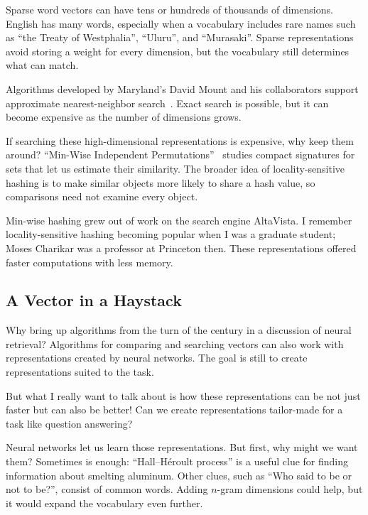 Sparse word vectors can have tens or hundreds of thousands of dimensions.  English has many words, especially when a vocabulary includes rare names such as ``the Treaty of Westphalia'', ``Uluru'', and ``Murasaki''.  Sparse representations avoid storing a weight for every dimension, but the vocabulary still determines what can match.

Algorithms developed by Maryland's David Mount and his collaborators support approximate nearest-neighbor search~\citep{arya-98}.  Exact search is possible, but it can become expensive as the number of dimensions grows.

If searching these high-dimensional representations is expensive, why keep them around?  ``Min-Wise Independent Permutations''~\citep{broder-98} studies compact signatures for sets that let us estimate their similarity.  The broader idea of locality-sensitive hashing is to make similar objects more likely to share a hash value, so comparisons need not examine every object.

Min-wise hashing grew out of work on the search engine AltaVista.  I remember locality-sensitive hashing becoming popular when I was a graduate student; Moses Charikar was a professor at Princeton then.  These representations offered faster computations with less memory.

\subsection{A Vector in a Haystack}
\label{sec:formats:deep-retrieval}
\label{sec:methods:deep-retrieval}

Why bring up algorithms from the turn of the century in a discussion of neural retrieval?  Algorithms for comparing and searching vectors can also work with representations created by neural networks.  The goal is still to create representations suited to the task.

But what I really want to talk about is how these representations can be not just faster but can also be better!  Can we create representations tailor-made for a task like question answering?

Neural networks let us learn those representations.  But first, why might we want them?  Sometimes \tfidf{} is enough: ``Hall--H\'eroult process'' is a useful clue for finding information about smelting aluminum.  Other clues, such as ``Who said to be or not to be?'', consist of common words.  Adding $n$-gram dimensions could help, but it would expand the vocabulary even further.

